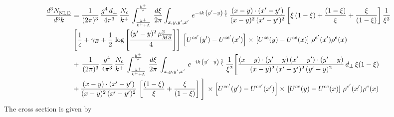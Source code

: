 \documentclass[9pt]{article}
\numberwithin{equation}{section}
\begin{document}
\begin{align}
     \frac{d^{3}N_{\rm NLO}^{\rm}}{d^{3}k}  & =  \frac{1}{(2\pi)^{3}}\,\frac{g^{4}\,d_{\perp}}{4\pi^{3}}\,\frac{N_{c}}{k^{+}}\,\int_{\frac{k^{+}}{k^{+}+\Lambda}}^{\frac{k^{+}}{\vee}}\, \frac{d\xi}{2\pi}\int_{x,y,y^{\prime},x'}\,e^{-ik\,\left(y'-y\right)\,\frac{1}{\xi}}\,\frac{(x-y)\cdot (x'-y')}{(x-y)^{2}\,(x'-y')^{2}}\,\bigg[\xi\,(1-\xi)+\frac{(1-\xi)}{\xi}+\frac{\xi}{(1-\xi)}\bigg]\,\frac{1}{\xi^{2}}\notag \\ & \left[\frac{1}{\epsilon} +\gamma_{E} +\frac{1}{2}\,\log{\left[\frac{(y'-y)^{2}\,\mu^{2}_{\overline{MS}}}{4}\right]}\right]\,\left[U^{ce'}(y') - U^{ce'}(x')\right] \times\, \left[U^{ce}(y) - U^{ce}(x)\right]\, \rho^{e'}(x') \rho^{e}(x)\notag \\ & +\,\frac{1}{(2\pi)^{3}}\,\frac{g^{4}}{4\pi^{3}}\,\frac{N_{c}}{k^{+}}\,\int_{\frac{k^{+}}{k^{+}+\Lambda}}^{\frac{k^{+}}{\vee}}\, \frac{d\xi}{2\pi}\,\int_{x,y,y^{\prime},x'}\,e^{-ik\,\left(y'-y\right)\,\frac{1}{\xi}}\,\frac{1}{\xi^{2}}\Bigg[\frac{(x-y)\cdot (y'-y)\, (x'-y')\cdot (y'-y)}{(x-y)^{2}\,(x'-y')^{2}\,(y'-y)^{2}}\,d_{\perp}\,\xi(1-\xi)\notag \\ & + \frac{(x-y)\cdot (x'-y')}{(x-y)^{2}\,(x'-y')^{2}}\,\left[\frac{(1-\xi)}{\xi}+\frac{\xi}{(1-\xi)}\right]\Bigg]\,\times \left[U^{ce'}(y') - U^{ce'}(x')\right] \times\, \left[U^{ce}(y) - U^{ce}(x)\right]\, \rho^{e'}(x') \rho^{e}(x)
\end{align}
The cross section is given by
\end{document}
